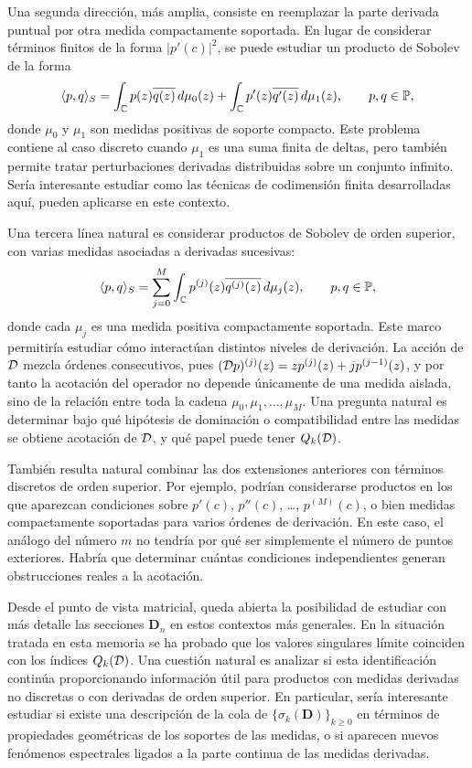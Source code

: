 Una segunda dirección, más amplia, consiste en reemplazar la parte derivada
puntual por otra medida compactamente soportada. En lugar de considerar términos
finitos de la forma \(|p'(c)|^2\), se puede estudiar un producto de Sobolev de la
forma
\[
	\langle p,q\rangle_S
	=
	\int_{\mathbb{C}}p(z)\overline{q(z)}\,d\mu_0(z)
	+
	\int_{\mathbb{C}}p'(z)\overline{q'(z)}\,d\mu_1(z),
	\qquad p,q\in\mathbb{P},
\]
donde \(\mu_0\) y \(\mu_1\) son medidas positivas de soporte compacto. Este
problema contiene al caso discreto cuando \(\mu_1\) es una suma finita de deltas,
pero también permite tratar perturbaciones derivadas distribuidas sobre un
conjunto infinito. Sería interesante estudiar como las técnicas de codimensión finita desarrolladas aquí, pueden aplicarse en este contexto.

Una tercera línea natural es considerar productos de Sobolev de orden superior,
con varias medidas asociadas a derivadas sucesivas:
\[
	\langle p,q\rangle_S
	=
	\sum_{j=0}^{M}
	\int_{\mathbb{C}}p^{(j)}(z)\overline{q^{(j)}(z)}\,d\mu_j(z),
	\qquad p,q\in\mathbb{P},
\]
donde cada \(\mu_j\) es una medida positiva compactamente soportada. Este marco
permitiría estudiar cómo interactúan distintos niveles de derivación. La acción
de \(\mathcal{D}\) mezcla órdenes consecutivos, pues
\((\mathcal{D} p)^{(j)}(z)=zp^{(j)}(z)+j p^{(j-1)}(z)\), y por tanto la acotación del operador no depende únicamente de una medida aislada,
sino de la relación entre toda la cadena \(\mu_0,\mu_1,\dots,\mu_M\). Una pregunta
natural es determinar bajo qué hipótesis de dominación o compatibilidad entre las
medidas se obtiene acotación de \(\mathcal{D}\), y qué papel puede tener $Q_k(\mathcal{D})$.

También resulta natural combinar las dos extensiones anteriores con términos
discretos de orden superior. Por ejemplo, podrían considerarse productos en los
que aparezcan condiciones sobre \(p'(c)\), \(p''(c)\), \dots, \(p^{(M)}(c)\), o
bien medidas compactamente soportadas para varios órdenes de derivación. En este
caso, el análogo del número \(m\) no tendría por qué ser simplemente el número de
puntos exteriores. Habría que determinar cuántas condiciones independientes generan obstrucciones reales a la acotación.

Desde el punto de vista matricial, queda abierta la posibilidad de estudiar con
más detalle las secciones \(\mathbf D_n\) en estos contextos más generales. En la
situación tratada en esta memoria se ha probado que los valores singulares límite
coinciden con los índices \(Q_k(\mathcal{D})\). Una cuestión natural es analizar si esta
identificación continúa proporcionando información útil para productos con
medidas derivadas no discretas o con derivadas de orden superior. En particular,
sería interesante estudiar si existe una descripción de la cola de
\(\{\sigma_k(\mathbf D)\}_{k\ge0}\) en términos de propiedades geométricas de los
soportes de las medidas, o si aparecen nuevos fenómenos espectrales ligados a la
parte continua de las medidas derivadas.


